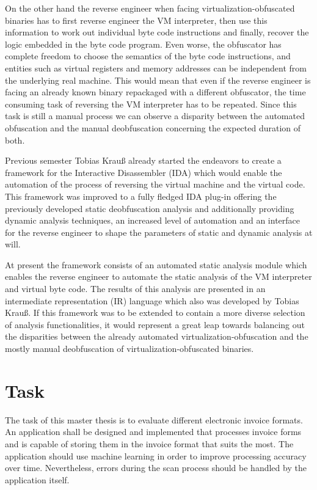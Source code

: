 \documentclass[10pt,twoside,a4paper,bibliography=totoc]{scrbook}
\newcommand{\echoOther}[1]{Tobias Krau{\ss}}
\begin{document}
On the other hand the reverse engineer when facing virtualization-obfuscated binaries has to first reverse engineer the VM interpreter, then use this information to work out individual byte code instructions and finally, recover the logic embedded in the byte code program\cite{Coogan:2011:DVS:2046707.2046739}. Even worse, the obfuscator has complete freedom to choose the semantics of the byte code instructions, and entities such as virtual registers and memory addresses can be independent from the underlying real machine\cite{DBLP:conf/sp/SharifLGL09}. This would mean that even if the reverse engineer is facing an already known binary repackaged with a different obfuscator, the time consuming task of reversing the VM interpreter has to be repeated. Since this task is still a manual process we can observe a disparity between the automated obfuscation and the manual deobfuscation concerning the expected duration of both.

Previous semester \echoOther{} already started the endeavors to create a framework for the Interactive Disassembler (IDA) which would enable the automation of the process of reversing the virtual machine and the virtual code\cite{Krau:Thesis2016}. This framework was improved to a fully fledged IDA plug-in offering the previously developed static deobfuscation analysis and additionally providing dynamic analysis techniques, an increased level of automation and an interface for the reverse engineer to shape the parameters of static and dynamic analysis at will.

At present the framework consists of an automated static analysis module which enables the reverse engineer to automate the static analysis of the VM interpreter and virtual byte code. The results of this analysis are presented in an intermediate representation (IR) language which also was developed by \echoOther{}\cite{Krau:Thesis2016}. If this framework was to be extended to contain a more diverse selection of analysis functionalities, it would represent a great leap towards balancing out the disparities between the already automated virtualization-obfuscation and the mostly manual deobfuscation of virtualization-obfuscated binaries.


\section{Task}
\label{sec1:task}
The task of this master thesis is to evaluate different electronic invoice formats. 
An application shall be designed and implemented that processes invoice forms and is capable of storing them in the invoice format that suits the most.
The application should use machine learning in order to improve processing accuracy over time.
Nevertheless, errors during the scan process should be handled by the application itself.
\end{document}
